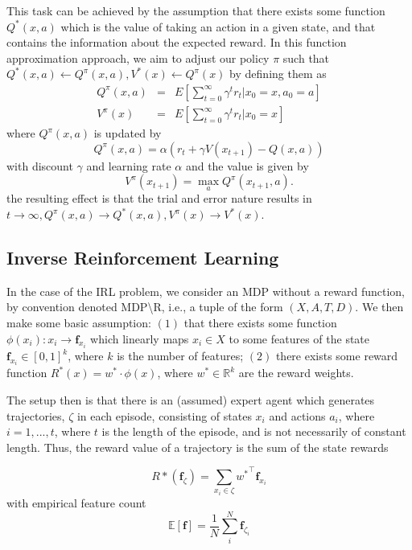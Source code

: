 \documentclass[10pt,technote]{IEEEtran}
\begin{document}
This task can be achieved by the assumption that there exists some function $Q^* (x,a)$ which is the value of taking an action in a given state, and that contains the information about the expected reward. In this function approximation approach, we aim to adjust our policy $\pi$ such that $Q^* (x,a) \leftarrow Q^\pi (x,a), V^* (x) \leftarrow Q^\pi (x)$ by defining them as
\begin{eqnarray}
	Q^\pi (x,a)&=&E\left[\sum_{t=0}^\infty\gamma^{t} r_t| x_0 = x, a_0 = a \right]\\
	V^\pi (x)&=&E\left[\sum_{t=0}^\infty\gamma^{t} r_t | x_0 = x \right] 
\end{eqnarray}
where $Q^\pi (x,a)$ is updated by~\cite{sutton1999reinforcement}
\begin{equation} \label{faeqn}
Q^\pi(x,a) = \alpha \left(r_t + \gamma V(x_{t+1}) -  Q(x,a) \right)
\end{equation}
with discount $\gamma$ and learning rate $\alpha$ and the value is given by
\begin{equation}
	V^\pi (x_{t+1})=\max_a Q^\pi (x_{t+1},a).
\end{equation}
the resulting effect is that the trial and error nature results in $t\rightarrow \infty, Q^\pi(x,a) \rightarrow Q^*(x,a), V^\pi(x) \rightarrow V^*(x)$.

\subsection{Inverse Reinforcement Learning}

In the case of the IRL problem, we consider an MDP without a reward function, by convention denoted MDP\textbackslash R, i.e., a tuple of the form $(X, A, T, D)$. We then make some basic assumption: $(1)$ that there exists some function $\phi (x_i) : x_i \rightarrow \textbf{f}_{x_i}$ which linearly maps $x_i \in X$ to some features of the state $\textbf{f}_{x_i} \in [0, 1]^k$, where $k$ is the number of features; $(2)$ there exists some reward function $R^*(x) = w^* \cdot \phi(x)$, where $w^* \in \mathbb{R}^k$ are the reward weights.

The setup then is that there is an (assumed) expert agent which generates trajectories, $\zeta$ in each episode, consisting of states $x_i$ and actions $a_i$, where $i= 1,..., t$, where $t$ is the length of the episode, and is not necessarily of constant length. Thus, the reward value of a trajectory is the sum of the state rewards

\begin{equation} \label{eqn:traj_reward}
R*(\textbf{f}_\zeta) = \sum_{x_i \in \zeta} {w^{*}}^\top \textbf{f}_{x_i}
\end{equation}
with empirical feature count
\begin{equation}
\mathbb{E}[\textbf{f}] = \frac{1}{N} \sum_{i}^{N} \textbf{f}_{\zeta_i}
\end{equation}
\end{document}
